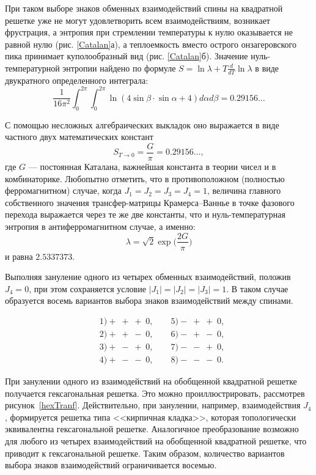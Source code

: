 \documentclass[utf8,12pt]{jetp}
\begin{document}
При таком выборе знаков обменных взаимодействий спины на квадратной решетке уже не могут удовлетворить всем взаимодействиям, возникает фрустрация, а энтропия при стремлении температуры к нулю оказывается не равной нулю (рис. \ref{Catalan}а), а теплоемкость вместо острого онзагеровского пика принимает куполообразный вид (рис. \ref{Catalan}б). Значение нуль-температурной энтропии найдено по формуле $S = \ln \lambda + T \frac{d}{dT}\ln \lambda$ в виде двукратного определенного интеграла:
\begin{equation*}
	\frac{1}{16\pi^2}\int_{0}^{2\pi}\int_{0}^{2\pi} \ln (4 \sin \beta \cdot \sin \alpha + 4) d\alpha d\beta = 0.29156\dots
\end{equation*}

С помощью несложных алгебраических выкладок оно выражается в виде частного двух математических констант
\begin{equation}
S_{T\rightarrow 0} = \frac{G}{\pi} = 0.29156\dots,
\label{g}
\end{equation} 
где $G$ --- постоянная Каталана, важнейшая константа в теории чисел и в комбинаторике. Любопытно отметить, что в противоположном (полностью ферромагнитном) случае, когда  $J_1 = J_2 = J_3 = J_4 = 1$, величина главного собственного значения трансфер-матрицы Крамерса--Ваннье в точке фазового перехода выражается через те же две константы, что и 
нуль-температурная энтропия в антиферромагнитном случае, а именно: 
\begin{equation}
	\lambda = \sqrt{2} \exp{\Big(\frac{2G}{\pi}\Big)}
\end{equation}
и равна $2.5337373$.

Выполняя зануление одного из четырех обменных взаимодействий, положив $J_4 = 0$, при этом сохраняется условие $|J_1| = |J_2| = |J_3| = 1$. В таком случае образуется восемь вариантов выбора знаков взаимодействий между спинами.

\begin{align*}
	&1) +\;+\;+\;0, \qquad   5) -\;+\;+\;0, \\
	&2) +\;+\;-\;0, \qquad  6) -\;+\;-\;0, \\
	&3) +\;-\;+\;0, \qquad  7) -\;-\;+\;0, \\
	&4) +\;-\;-\;0, \qquad  8) -\;-\;-\;0.
\end{align*}

При занулении одного из взаимодействий на обобщенной квадратной решетке получается гексагональная решетка. Это можно проиллюстрировать, рассмотрев рисунок~\ref{hexTranf}. Действительно, при занулении, например, взаимодействия $J_4$, формируется решетка типа <<кирпичная кладка>>, которая топологически эквивалентна гексагональной решетке. Аналогичное преобразование возможно для любого из четырех взаимодействий на обобщенной квадратной решетке, что приводит к гексагональной решетке. Таким образом, количество вариантов выбора знаков взаимодействий ограничивается восемью.
\end{document}
